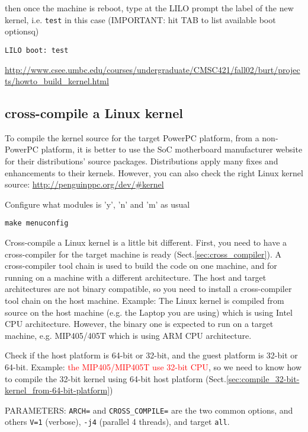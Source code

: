 then once the machine is reboot, type at the LILO prompt the label of the new
kernel, i.e. \verb!test! in this case (IMPORTANT: hit TAB to list available boot optionsq)
\begin{verbatim}
LILO boot: test
\end{verbatim}
\url{http://www.csee.umbc.edu/courses/undergraduate/CMSC421/fall02/burt/projects/howto_build_kernel.html}


\subsection{cross-compile a Linux kernel}
\label{sec:cross-compile-Linux-kernel}

To compile the kernel source for the target PowerPC platform, from a non-PowerPC
platform, it is better to use the SoC motherboard manufacturer website for their
distributions' source packages. Distributions apply many fixes and enhancements
to their kernels. However, you can also check the right Linux kernel source:
\url{http://penguinppc.org/dev/\#kernel}

Configure what modules is 'y', 'n' and 'm' as usual
\begin{verbatim}
make menuconfig
\end{verbatim}


Cross-compile a Linux kernel is a little bit different.
First, you need to have a cross-compiler for the target machine is ready
(Sect.\ref{sec:cross_compiler}).
A cross-compiler tool chain is used to build the code on one machine, and for
running on a machine with a different architecture.
The host and target architectures are not binary compatible, so you need to
install a cross-compiler tool chain on the host machine.
Example: The Linux kernel is compiled from source on the host machine (e.g. the
Laptop you are using) which is using Intel CPU architecture. However, the binary one is
expected to run on a target machine, e.g. MIP405/405T which is using ARM CPU
architecture.

Check if the host platform is 64-bit or 32-bit, and the guest platform is 32-bit
or 64-bit. Example:  
  \textcolor{red}{the MIP405/MIP405T use 32-bit CPU}, so we need to
  know how to compile the 32-bit kernel using 64-bit host platform
  (Sect.\ref{sec:compile_32-bit-kernel_from-64-bit-platform})


PARAMETERS: \verb!ARCH=! and \verb!CROSS_COMPILE=! are the two common options,
and others \verb!V=1! (verbose), \verb!-j4! (parallel 4 threads), and target \verb!all!.
  
